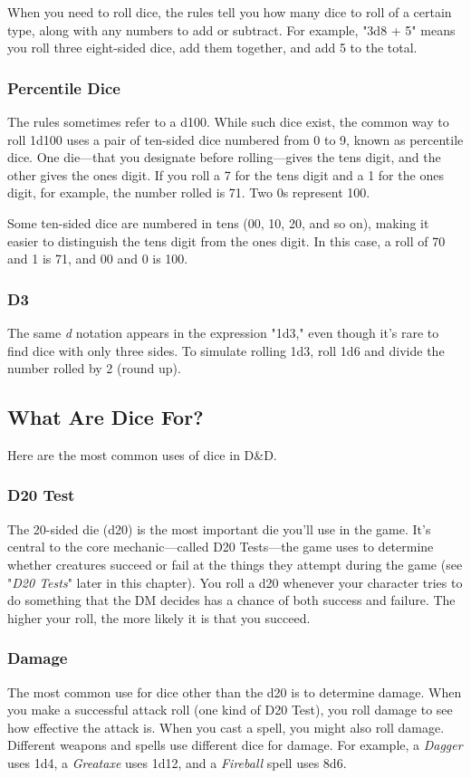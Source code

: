 \documentclass[10pt,a4paper,twoside,bg=print,twocolumn,openany,nodeprecatedcode]{dndbook}
\begin{document}
When you need to roll dice, the rules tell you how many dice to roll of a certain type, along with any numbers to add or subtract. For example, "3d8 + 5" means you roll three eight-sided dice, add them together, and add 5 to the total.

\subsubsection{Percentile Dice}
The rules sometimes refer to a d100. While such dice exist, the common way to roll 1d100 uses a pair of ten-sided dice numbered from 0 to 9, known as percentile dice. One die—that you designate before rolling—gives the tens digit, and the other gives the ones digit. If you roll a 7 for the tens digit and a 1 for the ones digit, for example, the number rolled is 71. Two 0s represent 100.

Some ten-sided dice are numbered in tens (00, 10, 20, and so on), making it easier to distinguish the tens digit from the ones digit. In this case, a roll of 70 and 1 is 71, and 00 and 0 is 100.

\subsubsection{D3}
The same \textit{d} notation appears in the expression "1d3," even though it's rare to find dice with only three sides. To simulate rolling 1d3, roll 1d6 and divide the number rolled by 2 (round up).

\subsection{What Are Dice For?}
Here are the most common uses of dice in D\&D.

\subsubsection{D20 Test}
The 20-sided die (d20) is the most important die you'll use in the game. It's central to the core mechanic—called D20 Tests—the game uses to determine whether creatures succeed or fail at the things they attempt during the game (see "\textit{D20 Tests}" later in this chapter). You roll a d20 whenever your character tries to do something that the DM decides has a chance of both success and failure. The higher your roll, the more likely it is that you succeed.

\subsubsection{Damage}
The most common use for dice other than the d20 is to determine damage. When you make a successful attack roll (one kind of D20 Test), you roll damage to see how effective the attack is. When you cast a spell, you might also roll damage. Different weapons and spells use different dice for damage. For example, a \textit{Dagger} uses 1d4, a \textit{Greataxe} uses 1d12, and a \textit{Fireball} spell uses 8d6.
\end{document}
